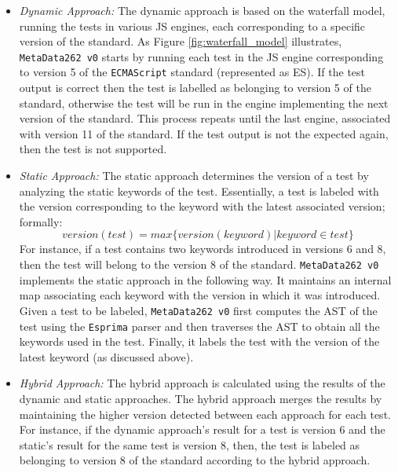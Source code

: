 \documentclass[runningheads]{llncs}
\begin{document}
\begin{itemize}
  \item \emph{Dynamic Approach:}
The dynamic approach is based on the waterfall model, running the tests in various JS engines, each corresponding to a specific version of the standard. As Figure \ref{fig:waterfall_model} illustrates, \texttt{MetaData262 v0} starts by running each test in the JS engine corresponding to version 5 of the \texttt{ECMAScript} standard (represented as ES). If the test output is correct then the test is labelled as belonging to version 5 of the standard, otherwise the test will be run in the engine implementing the next version of the standard. This process repeats until the last engine, associated with version 11 of the standard. If the test output is not the expected again, then the test is not supported.
%
  \item \emph{Static Approach:}
The static approach determines the version of a test by analyzing the static keywords of the test. Essentially, a test is labeled with the version corresponding to the keyword with the latest associated version; formally:
\[version(test) = max \{ version(keyword) | keyword \in test \} \]
For instance, if a test contains two keywords introduced in versions 6 and 8, then the test will belong to the version 8 of the standard. \texttt{MetaData262 v0} implements the static approach in the following way. It maintains an internal map associating each keyword with the version in which it was introduced. Given a test to be labeled, \texttt{MetaData262 v0} first computes the AST of the test using the \texttt{Esprima} parser and then traverses the AST to obtain all the keywords used in the test. Finally, it labels the test with the version of the latest keyword (as discussed above).
%
  \item \emph{Hybrid Approach:}
The hybrid approach is calculated using the results of the dynamic and static approaches. The hybrid approach merges the results by maintaining the higher version detected between each approach for each test. For instance, if the dynamic approach's result for a test is version 6 and the static's result for the same test is version 8, then, the test is labeled as belonging to version 8 of the standard according to the hybrid approach.
\end{itemize}
\end{document}

